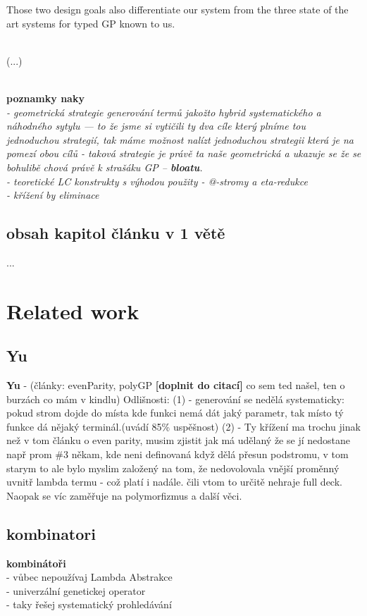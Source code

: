 \documentclass{llncs}
\begin{document}
Those two design goals also differentiate our system from 
the three state of the art systems for typed GP known to us.

~\\(...)

~\\
\textbf{poznamky naky}\textit{\\
- geometrická strategie generování termů jakožto hybrid systematického a náhodného sytylu --- to že jsme si vytičili ty dva cíle který plníme tou 
jednoduchou strategií, tak máme možnost nalízt jednoduchou strategii která 
je na pomezí obou cílů - taková strategie je právě ta naše geometrická 
a ukazuje se že se bohulibě chová právě k strašáku GP -- \textbf{bloatu}.\\
- teoretické LC konstrukty s výhodou použity - @-stromy a eta-redukce\\
- křížení by eliminace 
}


\subsection{obsah kapitol článku v 1 větě}
...

\section{Related work}
\subsection{Yu}
\textbf{Yu} - (články: evenParity, polyGP
\textbf{[doplnit do citací]}
 co sem ted našel, ten o burzách co mám v kindlu)
Odlišnosti:
(1) - generování se nedělá systematicky: pokud strom dojde do místa
kde funkci nemá dát jaký parametr, tak místo tý funkce dá nějaký 
terminál.(uvádí 85\% uspěšnost)  
(2) - Ty křížení ma trochu jinak než v tom článku o even parity,
musim zjistit jak má udělaný že se jí nedostane např prom \#3 někam,
kde neni definovaná když dělá přesun podstromu, v tom starym to ale 
bylo myslim založený na tom, že nedovolovala vnější proměnný uvnitř
lambda termu - což platí i nadále. čili vtom to určitě nehraje full deck.
Naopak se víc zaměřuje na polymorfizmus a další věci.

\subsection{kombinatori}

\textbf{kombinátoři} \\
- vůbec nepoužívaj Lambda Abstrakce\\
- univerzální genetickej operator\\
- taky řešej systematický prohledávání
\end{document}
